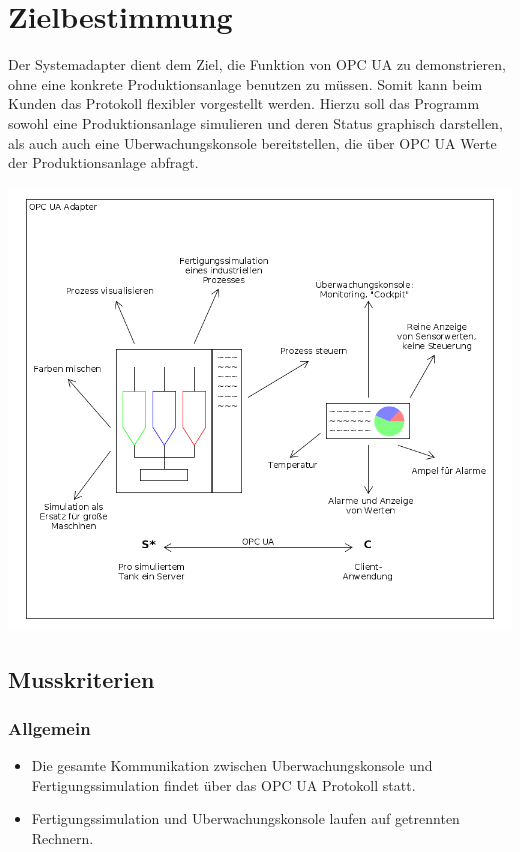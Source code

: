 \documentclass[parskip=full]{scrartcl}
\begin{document}
\section{Zielbestimmung}
Der \gls{Systemadapter} dient dem Ziel, die Funktion von \gls{OPC UA} zu demonstrieren, ohne eine konkrete \gls{Produktionsanlage}
benutzen zu müssen. Somit kann beim Kunden das Protokoll flexibler vorgestellt werden. Hierzu soll das Programm
sowohl eine \gls{Produktionsanlage} simulieren und deren Status graphisch darstellen, als auch auch eine \gls{Uberwachungskonsole}
bereitstellen, die über \gls{OPC UA} Werte der \gls{Produktionsanlage} abfragt.\\
\begin{center}
    \includegraphics[scale=0.5]{../system-sketch.png}
\end{center}

\subsection{Musskriterien}
\subsubsection{Allgemein}
\begin{itemize}
  \item Die gesamte Kommunikation zwischen \gls{Uberwachungskonsole} und \gls{Fertigungssimulation} findet \"uber das \gls{OPC UA} Protokoll statt.
  \item \gls{Fertigungssimulation} und \gls{Uberwachungskonsole} laufen auf getrennten Rechnern.
\end{itemize}
\end{document}
